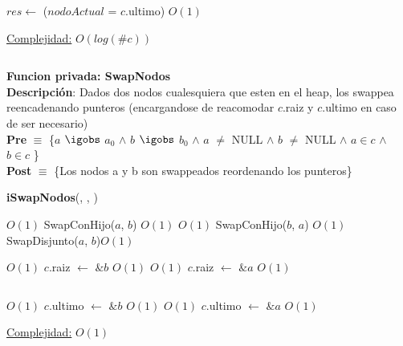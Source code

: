 \begin{Algoritmos}
\begin{algorithm}[H]
\begin{algorithmic}[1]
    \State $res \gets$ ($nodoActual$ = $c$.ultimo) \Comment $O(1)$

    \medskip
    \Statex \underline{Complejidad:} $O(log(\#c))$
\end{algorithmic}
\end{algorithm}



$ $\newline

\textbf{Funcion privada: SwapNodos}\\
\textbf{Descripci\'on}: Dados dos nodos cualesquiera que esten en el heap, los swappea reencadenando punteros (encargandose de reacomodar $c$.raiz y $c$.ultimo en caso de ser necesario)\\
\textbf{Pre} $\equiv$ \{$a$ $\igobs$ $a_0$ $\land$ $b$ $\igobs$ $b_0$ $\land$ $a$ $\neq$ NULL $\land$ $b$ $\neq$ NULL $\land$ $a \in c$ $\land$ $b \in c$ \}\\%
\textbf{Post} $\equiv$ \{Los nodos a y b son swappeados reordenando los punteros\}%
\begin{algorithm}[H]
{\textbf{iSwapNodos}(, , )}
\begin{algorithmic}[1]

     \Comment $O(1)$
        \State SwapConHijo($a$, $b$) \Comment $O(1)$
    \Else 
         \Comment $O(1)$
            \State SwapConHijo($b$, $a$) \Comment $O(1)$
        \Else
            \State SwapDisjunto($a$, $b$)\Comment $O(1)$
        \EndIf 
    \EndIf 

     \Comment $O(1)$
        \State $c$.raiz $\gets$ $\&b$ \Comment $O(1)$
    \Else
         \Comment $O(1)$
            \State $c$.raiz $\gets$ $\&a$ \Comment $O(1)$
        \EndIf
    \EndIf

    \State $ $ 

     \Comment $O(1)$
        \State $c$.ultimo $\gets$ $\&b$ \Comment $O(1)$
    \Else
         \Comment $O(1)$
            \State $c$.ultimo $\gets$ $\&a$ \Comment $O(1)$
        \EndIf
    \EndIf


    \medskip
    \Statex \underline{Complejidad:} $O(1)$

\end{algorithmic}
\end{algorithm}





\end{Algoritmos}
